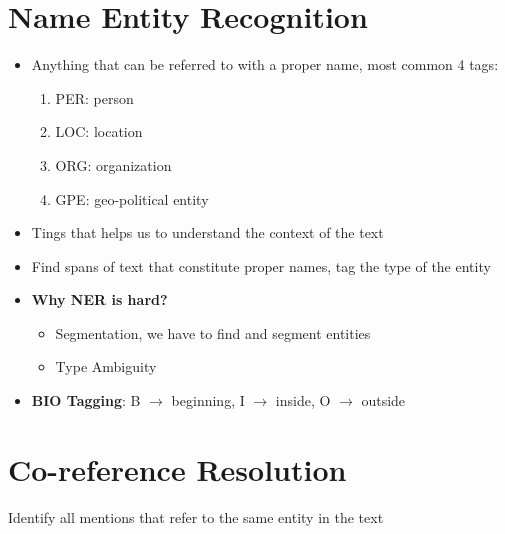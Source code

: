 \section{Name Entity Recognition}
\begin{itemize}
    \item Anything that can be referred to with a proper name, most common 4 tags:
    \begin{enumerate}
        \item PER: person
        \item LOC: location
        \item ORG: organization
        \item GPE: geo-political entity
    \end{enumerate}
    \item Tings that helps us to understand the context of the text
    \item Find spans of text that constitute proper names, tag the type of the entity
    \item \textbf{Why NER is hard?}
    \begin{itemize}
        \item Segmentation, we have to find and segment entities
        \item Type Ambiguity
    \end{itemize}
    \item \textbf{BIO Tagging}: B \(\rightarrow\) beginning, I \(\rightarrow\) inside, O \(\rightarrow\) outside
\end{itemize}

\section{Co-reference Resolution}
Identify all mentions that refer to the same entity in the text
